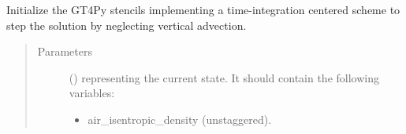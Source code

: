 \documentclass[letterpaper,10pt,english]{sphinxmanual}
\begin{document}
\begin{fulllineitems}
\begin{fulllineitems}
\begin{quote}
\begin{description}
\begin{itemize}
\end{itemize}

\end{description}\end{quote}

\end{fulllineitems}


\begin{fulllineitems}
\label{\detokenize{api:tasmania.dycore.prognostic_isentropic_nonconservative_centered.PrognosticIsentropicNonconservativeCentered._stencils_stepping_by_neglecting_vertical_advection_initialize}}
Initialize the GT4Py stencils implementing a time-integration centered scheme to step the solution
by neglecting vertical advection.
\begin{quote}\begin{description}
\item[{Parameters}] \leavevmode
{} () \textendash{} 
{\hyperref[\detokenize{api:tasmania.storages.state_isentropic.StateIsentropic}]{}} representing the current state.
It should contain the following variables:
\begin{itemize}
\item {} 
air\_isentropic\_density (unstaggered).

\end{itemize}


\end{description}\end{quote}

\end{fulllineitems}



\end{fulllineitems}
\end{document}
